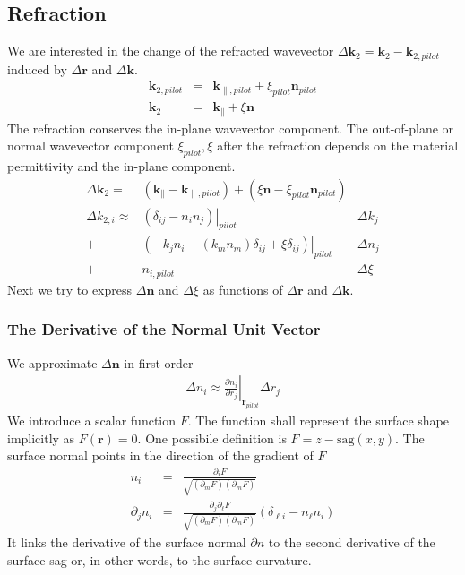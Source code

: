 \documentclass[12pt,a4paper,twoside,openright,BCOR10mm,headsepline,titlepage,abstracton,chapterprefix,final]{scrreprt}
\newcommand\Vector[1]{{\mathbf{#1}}}
\newcommand\wavenumber{k}
\newcommand\Wavevector{\Vector{\wavenumber}}
\begin{document}
\subsection{Refraction}

We are interested in the change of the refracted wavevector $\Delta\Wavevector_2 = {\Wavevector}_2 - \Wavevector_{2, pilot}$ induced by $\Delta\Vector{r}$ and $\Delta\Wavevector$.
\begin{eqnarray}
 \Wavevector_{2, pilot} &=& \Wavevector_{\parallel, pilot} + \xi_{pilot} \Vector{n}_{pilot} 
 \\
 {\Wavevector}_2 &=& {\Wavevector}_{\parallel} + {\xi} {\Vector{n}} 
\end{eqnarray}
The refraction conserves the in-plane wavevector component. 
The out-of-plane or normal wavevector component $\xi_{pilot}, {\xi}$ after the refraction depends on the material permittivity and the in-plane component.
\begin{eqnarray}
 \Delta\Wavevector_2 =& ( {\Wavevector}_{\parallel} - \Wavevector_{\parallel, pilot} ) + ( {\xi} {\Vector{n}} - \xi_{pilot} \Vector{n}_{pilot} )&
\\[2ex]
 \Delta \wavenumber_{2,i} \approx&
   \left.
     \left( \delta_{ij}  - n_{i} n_{j} \right)
   \right|_{pilot}
   &\Delta\wavenumber_j
   \nonumber\\
   +&
   \left.
   \left(
     - \wavenumber_{j}  n_{i} 
     - (\wavenumber_{m} n_{m}) \delta_{ij}  
     + \xi \delta_{ij}
   \right) 
   \right|_{pilot}
   &\Delta n_{j}
   \nonumber \\
   +& n_{i, pilot} &\Delta\xi 
\end{eqnarray}
Next we try to express $\Delta\Vector{n}$ and $\Delta\xi$ as functions of $\Delta\Vector{r}$ and $\Delta\Wavevector$.


\subsubsection{The Derivative of the Normal Unit Vector}
We approximate $\Delta\Vector{n}$ in first order
\begin{eqnarray}
 \Delta n_i \approx \left. \frac{\partial n_i}{\partial r_j} \right|_{\Vector{r}_{pilot}} \Delta r_j
\end{eqnarray}
We introduce a scalar function $F$. The function shall represent the surface shape implicitly as $F(\Vector{r}) = 0$. 
One possibile definition is $F = z - \textrm{sag}(x,y)$. The surface normal points in the direction of the gradient of $F$
\begin{eqnarray}
 n_i &=& \frac{\partial_i F}{\sqrt{(\partial_m F)(\partial_m F)}}
 \\
 \partial_j n_i &=& \frac{\partial_j \partial_\ell F}{\sqrt{(\partial_m F)(\partial_m F)}} \left(\delta_{\ell i} - n_\ell n_i\right)
 \label{eq:nderivative}
\end{eqnarray}
It links the derivative of the surface normal $\partial n$ to the second derivative of the surface sag 
or, in other words, to the surface curvature.
\end{document}
